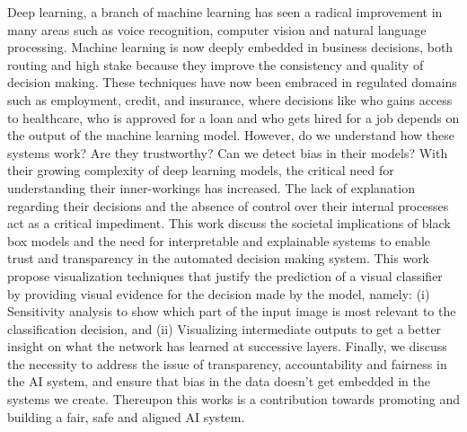 %
%
%

\begin{publicabstract}

Deep learning, a branch of machine learning has seen a radical improvement in many areas such as voice recognition, computer vision and natural language processing. Machine learning is now deeply embedded in business decisions, both routing and high stake because they improve the consistency and quality of decision making. These techniques have now been embraced in regulated domains such as employment, credit, and insurance, where decisions like who gains access to healthcare, who is approved for a loan and who gets hired for a job depends on the output of the machine learning model. However, do we understand how these systems work? Are they trustworthy? Can we detect bias in their models? With their growing complexity of deep learning models,  the critical need for understanding their inner-workings has increased. The lack of explanation regarding their decisions and the absence of control over their internal processes act as a critical impediment. This work discuss the societal implications of black box models and the need for interpretable and explainable systems to enable trust and transparency in the automated decision making system. This work propose visualization techniques that justify the prediction of a visual classifier by providing visual evidence for the decision made by the model, namely: (i) Sensitivity analysis to  show which part of the  input image  is  most  relevant  to  the  classification decision, and (ii) Visualizing intermediate outputs to get a better insight on what the network has learned at successive layers. Finally, we discuss the necessity to address the issue of transparency, accountability and fairness in the AI system, and ensure that bias in the data doesn't get embedded in the systems we create. Thereupon this works is a contribution towards promoting and building a fair, safe and aligned AI system.


\end{publicabstract}


